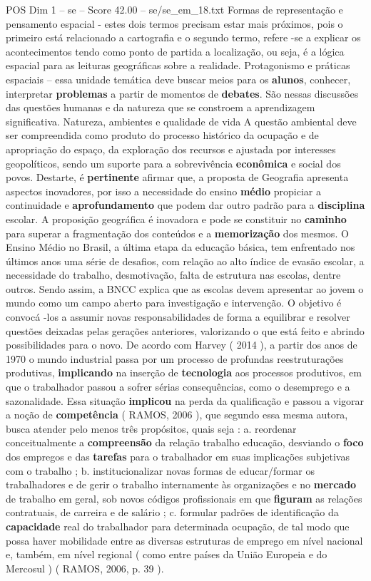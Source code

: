 \begin{textsample}{POS Dim 1 – se – Score 42.00 – se/se\_em\_18.txt}
Formas de representação e pensamento espacial - estes dois termos precisam estar mais próximos, pois o primeiro está relacionado a cartografia e o segundo termo, refere -se a explicar os acontecimentos tendo como ponto de partida a localização, ou seja, é a lógica espacial para as leituras geográficas sobre a realidade.
Protagonismo e práticas espaciais – essa unidade temática deve buscar meios para os \textbf{alunos}, conhecer, interpretar \textbf{problemas} a partir de momentos de \textbf{debates}.
São nessas discussões das questões humanas e da natureza que se constroem a aprendizagem significativa.
Natureza, ambientes e qualidade de vida A questão ambiental deve ser compreendida como produto do processo histórico da ocupação e de apropriação do espaço, da exploração dos recursos e ajustada por interesses geopolíticos, sendo um suporte para a sobrevivência \textbf{econômica} e social dos povos.
Destarte, é \textbf{pertinente} afirmar que, a proposta de Geografia apresenta aspectos inovadores, por isso a necessidade do ensino \textbf{médio} propiciar a continuidade e \textbf{aprofundamento} que podem dar outro padrão para a \textbf{disciplina} escolar.
A proposição geográfica é inovadora e pode se constituir no \textbf{caminho} para superar a fragmentação dos conteúdos e a \textbf{memorização} dos mesmos.
O Ensino Médio no Brasil, a última etapa da educação básica, tem enfrentado nos últimos anos uma série de desafios, com relação ao alto índice de evasão escolar, a necessidade do trabalho, desmotivação, falta de estrutura nas escolas, dentre outros.
Sendo assim, a BNCC explica que as escolas devem apresentar ao jovem o mundo como um campo aberto para investigação e intervenção.
O objetivo é convocá -los a assumir novas responsabilidades de forma a equilibrar e resolver questões deixadas pelas gerações anteriores, valorizando o que está feito e abrindo possibilidades para o novo.
De acordo com Harvey ( 2014 ), a partir dos anos de 1970 o mundo industrial passa por um processo de profundas reestruturações produtivas, \textbf{implicando} na inserção de \textbf{tecnologia} aos processos produtivos, em que o trabalhador passou a sofrer sérias consequências, como o desemprego e a sazonalidade.
Essa situação \textbf{implicou} na perda da qualificação e passou a vigorar a noção de \textbf{competência} ( RAMOS, 2006 ), que segundo essa mesma autora, busca atender pelo menos três propósitos, quais seja : a. reordenar conceitualmente a \textbf{compreensão} da relação trabalho educação, desviando o \textbf{foco} dos empregos e das \textbf{tarefas} para o trabalhador em suas implicações subjetivas com o trabalho ; b. institucionalizar novas formas de educar/formar os trabalhadores e de gerir o trabalho internamente às organizações e no \textbf{mercado} de trabalho em geral, sob novos códigos profissionais em que \textbf{figuram} as relações contratuais, de carreira e de salário ; c. formular padrões de identificação da \textbf{capacidade} real do trabalhador para determinada ocupação, de tal modo que possa haver mobilidade entre as diversas estruturas de emprego em nível nacional e, também, em nível regional ( como entre países da União Europeia e do Mercosul ) ( RAMOS, 2006, p. 39 ).

\end{textsample}

